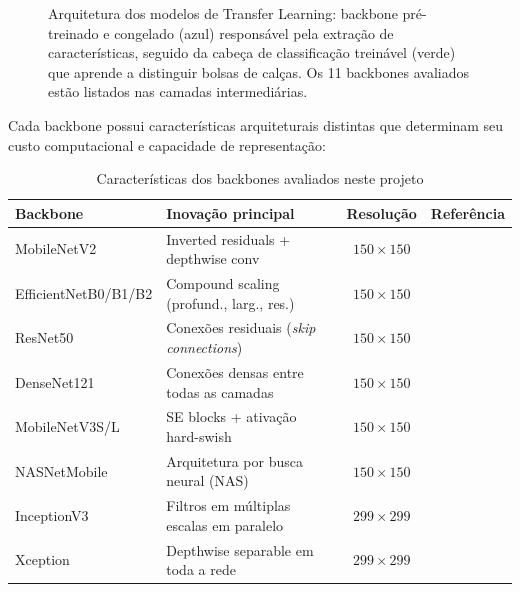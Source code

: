 \documentclass[12pt,a4paper]{article}
\begin{document}
\begin{figure}[H]
\caption{Arquitetura dos modelos de Transfer Learning: backbone pré-treinado
         e congelado (azul) responsável pela extração de características, seguido
         da cabeça de classificação treinável (verde) que aprende a distinguir
         bolsas de calças. Os 11 backbones avaliados estão listados nas camadas
         intermediárias.}
\label{fig:arquitetura_tl}
\end{figure}

Cada backbone possui características arquiteturais distintas que determinam
seu custo computacional e capacidade de representação:

\begin{table}[H]
\centering
\caption{Características dos backbones avaliados neste projeto}
\label{tab:backbone_resumo}
\small
\begin{tabular}{llcc}
\toprule
\textbf{Backbone} & \textbf{Inovação principal} & \textbf{Resolução} & \textbf{Referência} \\
\midrule
MobileNetV2          & Inverted residuals + depthwise conv     & $150\times150$ & \cite{sandler2018mobilenetv2} \\
EfficientNetB0/B1/B2 & Compound scaling (profund., larg., res.)& $150\times150$ & \cite{tan2019efficientnet}    \\
ResNet50             & Conexões residuais (\emph{skip connections}) & $150\times150$ & \cite{he2016deep}          \\
DenseNet121          & Conexões densas entre todas as camadas  & $150\times150$ & \cite{huang2017densely}       \\
MobileNetV3S/L       & SE blocks + ativação hard-swish         & $150\times150$ & \cite{howard2019searching}    \\
NASNetMobile         & Arquitetura por busca neural (NAS)      & $150\times150$ & \cite{zoph2018learning}       \\
InceptionV3          & Filtros em múltiplas escalas em paralelo& $299\times299$ & \cite{szegedy2016rethinking}  \\
Xception             & Depthwise separable em toda a rede      & $299\times299$ & \cite{chollet2017xception}    \\
\bottomrule
\end{tabular}
\end{table}
\end{document}

